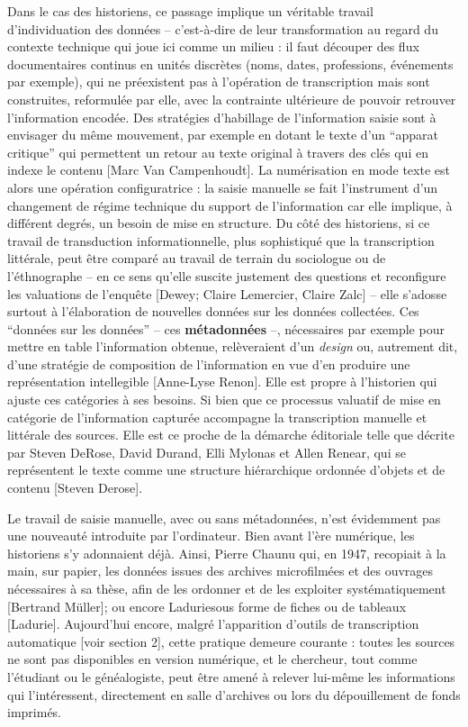 Dans le cas des historiens, ce passage implique un véritable travail d’individuation des données -- c'est-à-dire de leur transformation au regard du contexte technique qui joue ici comme un milieu : il faut découper des flux documentaires continus en unités discrètes (noms, dates, professions, événements par exemple), qui ne préexistent pas à l’opération de transcription mais sont construites, reformulée par elle, avec la contrainte ultérieure de pouvoir retrouver l'information encodée. Des stratégies d'habillage de l'information saisie sont à envisager du même mouvement, par exemple en dotant le texte d'un \enquote{apparat critique} qui permettent un retour au texte original à travers des clés qui en indexe le contenu [Marc Van Campenhoudt]. La numérisation en mode texte est alors une opération configuratrice : la saisie manuelle se fait l’instrument d’un changement de régime technique du support de l'information car elle implique, à différent degrés, un besoin de mise en structure. Du côté des historiens, si ce travail de transduction informationnelle, plus sophistiqué que la transcription littérale, peut être comparé au travail de terrain du sociologue ou de l'éthnographe -- en ce sens qu'elle suscite justement des questions et reconfigure les valuations de l'enquête [Dewey; Claire Lemercier, Claire Zalc] -- elle s'adosse surtout à l'élaboration de nouvelles données sur les données collectées. Ces \enquote{données sur les données} -- ces \textbf{métadonnées} --, nécessaires par exemple pour mettre en table l'information obtenue, relèveraient d'un \emph{design} ou, autrement dit, d'une stratégie de composition de l'information en vue d'en produire une représentation intellegible [Anne-Lyse Renon]. Elle est propre à l'historien qui ajuste ces catégories à ses besoins. Si bien que ce processus valuatif de mise en catégorie de l'information capturée accompagne la transcription manuelle et littérale des sources. Elle est ce proche de la démarche éditoriale telle que décrite par Steven DeRose, David Durand, Elli Mylonas et Allen Renear, qui se représentent le texte comme une structure hiérarchique ordonnée d'objets et de contenu [Steven Derose].

Le travail de saisie manuelle, avec ou sans métadonnées, n’est évidemment pas une nouveauté introduite par l’ordinateur. Bien avant l’ère numérique, les historiens s’y adonnaient déjà. Ainsi, Pierre Chaunu qui, en 1947, recopiait à la main, sur papier, les données issues des archives microfilmées et des ouvrages nécessaires à sa thèse, afin de les ordonner et de les exploiter systématiquement [Bertrand Müller]; ou encore Laduriesous forme de fiches ou de tableaux [Ladurie]. Aujourd’hui encore, malgré l’apparition d’outils de transcription automatique [voir section 2], cette pratique demeure courante : toutes les sources ne sont pas disponibles en version numérique, et le chercheur, tout comme l’étudiant ou le généalogiste, peut être amené à relever lui-même les informations qui l’intéressent, directement en salle d’archives ou lors du dépouillement de fonds imprimés. 

